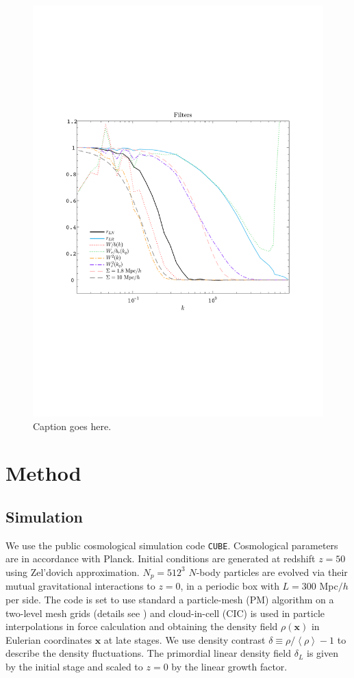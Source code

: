 \documentclass[aps,prd,twocolumn,superscriptaddress,amsfont,amssymb,amsmath,nofootinbib,showpacs,balancelastpage]{revtex4-1}
\newcommand{\bs}{\boldsymbol}
\newcommand{\lb}{\left\langle}
\newcommand{\rb}{\right\rangle}
\begin{document}
\begin{figure}[t] \centering
  \includegraphics[width=1.0\linewidth]{fig2.pdf}
  \caption{Caption goes here.}
  \label{fig.2}
\end{figure}

\section{Method}\label{sec.method}

\subsection{Simulation}
We use the public cosmological simulation code {\tt CUBE}. Cosmological parameters are in accordance with Planck. Initial conditions are generated at redshift $z=50$ using Zel'dovich approximation. $N_p=512^3$ $N$-body particles are evolved via their mutual gravitational interactions to $z=0$, in a periodic box with $L=300$ Mpc$/h$ per side. The code is set to use standard a particle-mesh (PM) algorithm \cite{1988csup.book.....H} on a two-level mesh grids (details see \cite{2013MNRAS.436..540H}) and cloud-in-cell (CIC) is used in particle interpolations in force calculation and obtaining the density field $\rho({\bs x})$ in Eulerian coordinates ${\bs x}$ at late stages. We use density contrast $\delta\equiv\rho/\lb\rho\rb-1$ to describe the density fluctuations. The primordial linear density field $\delta_L$ is given by the initial stage and scaled to $z=0$ by the linear growth factor.
\end{document}
